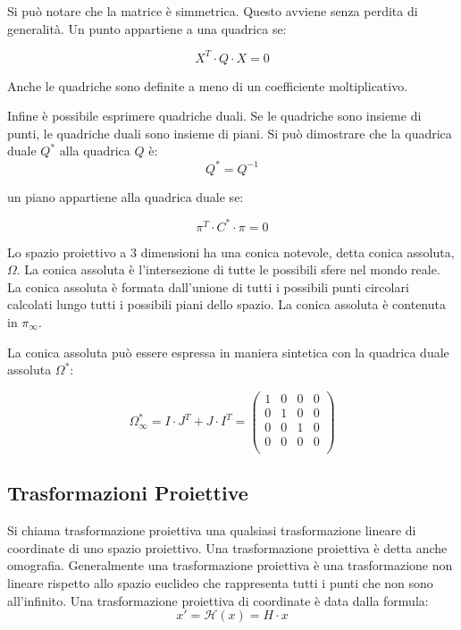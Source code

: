 Si può notare che la matrice è simmetrica. Questo avviene senza perdita di generalità.
Un punto appartiene a una quadrica se:

\begin{equation*}
 X^T\cdot Q \cdot X = 0
\end{equation*}

Anche le quadriche sono definite a meno di un coefficiente moltiplicativo.

Infine è possibile esprimere quadriche duali. Se le quadriche sono insieme di punti, le quadriche duali sono insieme di piani.
Si può dimostrare che la quadrica duale $Q^*$ alla quadrica $Q$ è:
\begin{equation*}
 Q^*=Q^{-1}
\end{equation*}

un piano appartiene alla quadrica duale se:

\begin{equation*}
 \pi^T\cdot C^* \cdot \pi = 0
\end{equation*}

Lo spazio proiettivo a 3 dimensioni ha una conica notevole, detta conica assoluta, $\Omega$. La conica assoluta è l'intersezione di tutte le possibili sfere nel mondo reale. La conica assoluta è formata dall'unione di tutti i possibili punti circolari calcolati lungo tutti i possibili piani dello spazio.
La conica assoluta è contenuta in $\pi_\infty$.

La conica assoluta può essere espressa in maniera sintetica con la quadrica duale assoluta $\Omega^*$:

\begin{equation*}
 \Omega^*_\infty = I\cdot J^T + J\cdot I^T =\begin{pmatrix} 1 & 0 & 0 & 0 \\ 0 & 1 & 0 & 0 \\ 0 & 0 & 1 & 0 \\ 0 & 0 & 0 & 0 \\ \end{pmatrix}
\end{equation*}

\subsection{Trasformazioni Proiettive}

Si chiama trasformazione proiettiva una qualsiasi trasformazione lineare di coordinate di uno spazio proiettivo. Una trasformazione proiettiva è detta anche omografia.
Generalmente una trasformazione proiettiva è una trasformazione non lineare rispetto allo spazio euclideo che rappresenta tutti i punti che non sono all'infinito.
Una trasformazione proiettiva di coordinate è data dalla formula:
\begin{equation*}
 x' = \mathcal{H}(x) = H\cdot x
\end{equation*}


